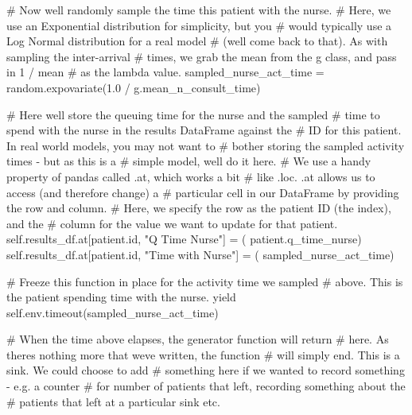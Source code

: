\documentclass[
  letterpaper,
  DIV=11,
  numbers=noendperiod]{scrreprt}
\newenvironment{Shaded}{\begin{snugshade}}{\end{snugshade}}
\newcommand{\BuiltInTok}[1]{\textcolor[rgb]{0.00,0.23,0.31}{#1}}
\newcommand{\CommentTok}[1]{\textcolor[rgb]{0.37,0.37,0.37}{#1}}
\newcommand{\ControlFlowTok}[1]{\textcolor[rgb]{0.00,0.23,0.31}{#1}}
\newcommand{\FloatTok}[1]{\textcolor[rgb]{0.68,0.00,0.00}{#1}}
\newcommand{\NormalTok}[1]{\textcolor[rgb]{0.00,0.23,0.31}{#1}}
\newcommand{\OperatorTok}[1]{\textcolor[rgb]{0.37,0.37,0.37}{#1}}
\newcommand{\StringTok}[1]{\textcolor[rgb]{0.13,0.47,0.30}{#1}}
\newcommand{\VariableTok}[1]{\textcolor[rgb]{0.07,0.07,0.07}{#1}}
\begin{document}
\begin{tcolorbox}
\begin{Shaded}
\begin{Highlighting}[]
            \CommentTok{\# Now we\textquotesingle{}ll randomly sample the time this patient with the nurse.}
            \CommentTok{\# Here, we use an Exponential distribution for simplicity, but you}
            \CommentTok{\# would typically use a Log Normal distribution for a real model}
            \CommentTok{\# (we\textquotesingle{}ll come back to that).  As with sampling the inter{-}arrival}
            \CommentTok{\# times, we grab the mean from the g class, and pass in 1 / mean}
            \CommentTok{\# as the lambda value.}
\NormalTok{            sampled\_nurse\_act\_time }\OperatorTok{=}\NormalTok{ random.expovariate(}\FloatTok{1.0} \OperatorTok{/}
\NormalTok{                                                        g.mean\_n\_consult\_time)}

            \CommentTok{\# Here we\textquotesingle{}ll store the queuing time for the nurse and the sampled}
            \CommentTok{\# time to spend with the nurse in the results DataFrame against the}
            \CommentTok{\# ID for this patient.  In real world models, you may not want to}
            \CommentTok{\# bother storing the sampled activity times {-} but as this is a}
            \CommentTok{\# simple model, we\textquotesingle{}ll do it here.}
            \CommentTok{\# We use a handy property of pandas called .at, which works a bit}
            \CommentTok{\# like .loc.  .at allows us to access (and therefore change) a}
            \CommentTok{\# particular cell in our DataFrame by providing the row and column.}
            \CommentTok{\# Here, we specify the row as the patient ID (the index), and the}
            \CommentTok{\# column for the value we want to update for that patient.}
            \VariableTok{self}\NormalTok{.results\_df.at[patient.}\BuiltInTok{id}\NormalTok{, }\StringTok{"Q Time Nurse"}\NormalTok{] }\OperatorTok{=}\NormalTok{ (}
\NormalTok{                patient.q\_time\_nurse)}
            \VariableTok{self}\NormalTok{.results\_df.at[patient.}\BuiltInTok{id}\NormalTok{, }\StringTok{"Time with Nurse"}\NormalTok{] }\OperatorTok{=}\NormalTok{ (}
\NormalTok{                sampled\_nurse\_act\_time)}

            \CommentTok{\# Freeze this function in place for the activity time we sampled}
            \CommentTok{\# above.  This is the patient spending time with the nurse.}
            \ControlFlowTok{yield} \VariableTok{self}\NormalTok{.env.timeout(sampled\_nurse\_act\_time)}

            \CommentTok{\# When the time above elapses, the generator function will return}
            \CommentTok{\# here.  As there\textquotesingle{}s nothing more that we\textquotesingle{}ve written, the function}
            \CommentTok{\# will simply end.  This is a sink.  We could choose to add}
            \CommentTok{\# something here if we wanted to record something {-} e.g. a counter}
            \CommentTok{\# for number of patients that left, recording something about the}
            \CommentTok{\# patients that left at a particular sink etc.}


\end{Highlighting}
\end{Shaded}
\end{tcolorbox}
\end{document}
